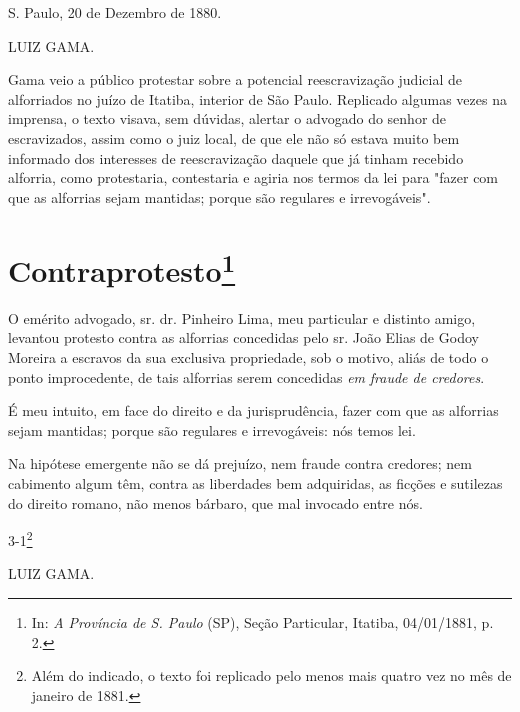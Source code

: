 S. Paulo, 20 de Dezembro de 1880.

LUIZ GAMA.

\pagebreak
\mbox{}\vfill
\thispagestyle{empty}

{\small\noindent
Gama veio a público protestar sobre a potencial reescravização
judicial de alforriados no juízo de Itatiba, interior de São Paulo.
Replicado algumas vezes na imprensa, o texto visava, sem dúvidas,
alertar o advogado do senhor de escravizados, assim como o juiz local,
de que ele não só estava muito bem informado dos interesses de
reescravização daquele que já tinham recebido alforria, como
protestaria, contestaria e agiria nos termos da lei para "fazer com que
as alforrias sejam mantidas; porque são regulares e irrevogáveis". }

\chapter{Contraprotesto\footnote[*]{In: \emph{A Província de S.
  Paulo} (SP), Seção Particular, Itatiba, 04/01/1881, p. 2.}}


O emérito advogado, sr. dr. Pinheiro Lima, meu particular e distinto
amigo, levantou protesto contra as alforrias concedidas pelo sr. João
Elias de Godoy Moreira a escravos da sua exclusiva propriedade, sob o
motivo, aliás de todo o ponto improcedente, de tais alforrias serem
concedidas \emph{em} \emph{fraude de credores}.

É meu intuito, em face do direito e da jurisprudência, fazer com que as
alforrias sejam mantidas; porque são regulares e irrevogáveis: nós temos
lei.

Na hipótese emergente não se dá prejuízo, nem fraude contra credores;
nem cabimento algum têm, contra as liberdades bem adquiridas, as ficções
e sutilezas do direito romano, não menos bárbaro, que mal invocado entre
nós.

3-1\footnote{Além do indicado, o texto foi replicado pelo menos mais
  quatro vez no mês de janeiro de 1881.}

LUIZ GAMA.

\pagebreak
\mbox{}\vfill
\thispagestyle{empty}

